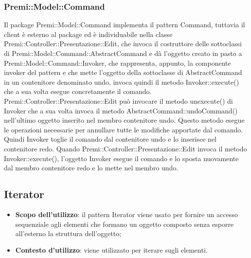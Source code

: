 {{		\subsubsection{Premi::Model::Command}{
			Il package Premi::Model::Command implementa il pattern Command, tuttavia il client è esterno al package ed è individuabile nella classe Premi::Controller::Presentazione::Edit, che invoca il costruttore delle sottoclassi di Premi::Model::Command::AbstractCommand e dà l'oggetto creato in pasto a Premi::Model::Command::Invoker, che rappresenta, appunto, la componente invoker del pattern e che mette l'oggetto della sottoclasse di AbstractCommand in un contenitore denominato undo, invoca quindi il metodo Invoker::execute() che a sua volta esegue concretamente il comando.\\
			Premi::Controller::Presentazione::Edit può invocare il metodo unexecute() di Invoker che a sua volta invoca il metodo AbstractCommand::undoCommand() nell'ultimo oggetto inserito nel membro contenitore undo. Questo metodo esegue le operazioni necessarie per annullare tutte le modifiche apportate dal comando. Quindi Invoker toglie il comando dal contenitore undo e lo inserisce nel contenitore redo. Quando Premi::Controller::Presentazione::Edit invoca il metodo Invoker::execute(), l'oggetto Invoker esegue il comando e lo sposta nuovamente dal membro contenitore redo e lo mette nel membro undo.    
		}
	}
	\subsection{Iterator}{
		\begin{itemize}
			\item \textbf{Scopo dell’utilizzo}: il pattern Iterator viene usato per fornire un accesso sequenziale agli elementi che formano un oggetto composto senza esporre all’esterno la struttura dell’oggetto;
			\item \textbf{Contesto d’utilizzo}: viene utilizzato per iterare sugli elementi.
		\end{itemize}
	}
}
